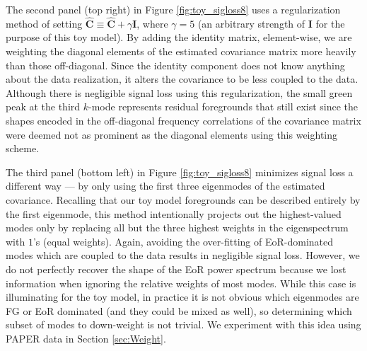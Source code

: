 \documentclass[preprint2,numberedappendix,tighten]{aastex6}  %
\begin{document}
%
The second panel (top right) in Figure \ref{fig:toy_sigloss8} uses a regularization method of setting $\widehat{\textbf{C}} \equiv 
\widehat{\textbf{C}} + \gamma\textbf{I}$, where $\gamma = 5$ (an arbitrary strength 
of $\textbf{I}$ for the purpose of this toy model). By adding the identity matrix, element-wise, we are weighting the diagonal 
elements of the estimated covariance matrix more heavily than those off-diagonal. Since the identity component does not know anything about the data realization, it alters the covariance to be less coupled to the data. Although there is negligible signal loss using this regularization, the small green peak at the third $k$-mode represents residual foregrounds that still exist since the shapes encoded in the off-diagonal frequency correlations of the covariance matrix were deemed not as prominent as the diagonal elements using this weighting scheme. 

The third panel (bottom left) in Figure \ref{fig:toy_sigloss8} minimizes signal loss a different way --- 
by only using the first three eigenmodes of the estimated covariance. Recalling that our toy model foregrounds can be described entirely by the first eigenmode, this 
method intentionally projects out the highest-valued modes only by replacing all but the three highest weights in the 
eigenspectrum with $1$'s (equal weights). Again, avoiding the over-fitting of EoR-dominated modes which are coupled to the data results in negligible signal loss. However, we do 
not perfectly recover the shape of the EoR power spectrum because we lost information when ignoring the relative weights of most modes. While this case is illuminating for the toy model, in practice it is not obvious which eigenmodes are FG or EoR dominated (and they could be mixed as well), so determining which subset of modes to down-weight is not trivial. We experiment with this idea using PAPER data in Section \ref{sec:Weight}.
\end{document}

